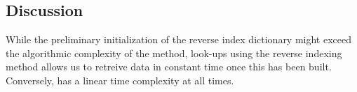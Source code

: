 \subsection{Discussion}
While the preliminary initialization of the reverse index dictionary might
exceed the algorithmic complexity of the  method, look-ups using
the reverse indexing method allows us to retreive data in constant time once
this has been built. Conversely,  has a linear time complexity at
all times.
